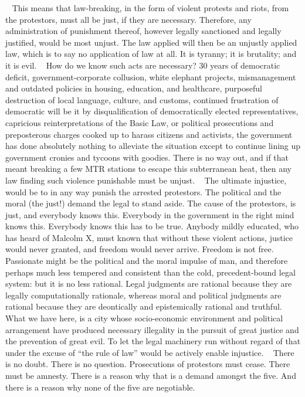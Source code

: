  
This means that law-breaking, in the form of violent protests and riots, from the protestors, must all be just, if they are necessary. Therefore, any administration of punishment thereof, however legally sanctioned and legally justified, would be most unjust. The law applied will then be an unjustly applied law, which is to say no application of law at all. It is tyranny; it is brutality; and it is evil.
 
How do we know such acts are necessary? 30 years of democratic deficit, government-corporate collusion, white elephant projects, mismanagement and outdated policies in housing, education, and healthcare, purposeful destruction of local language, culture, and customs, continued frustration of democratic will be it by disqualification of democratically elected representatives, capricious reinterpretations of the Basic Law, or political prosecutions and preposterous charges cooked up to harass citizens and activists, the government has done absolutely nothing to alleviate the situation except to continue lining up government cronies and tycoons with goodies. There is no way out, and if that meant breaking a few MTR stations to escape this subterranean heat, then any law finding such violence punishable must be unjust.
 
The ultimate injustice, would be to in any way punish the arrested protestors. The political and the moral (the just!) demand the legal to stand aside. The cause of the protestors, is just, and everybody knows this. Everybody in the government in the right mind knows this. Everybody knows this has to be true. Anybody mildly educated, who has heard of Malcolm X, must known that without these violent actions, justice would never granted, and freedom would never arrive. Freedom is not free.
 
Passionate might be the political and the moral impulse of man, and therefore perhaps much less tempered and consistent than the cold, precedent-bound legal system: but it is no less rational. Legal judgments are rational because they are legally computationally rationale, whereas moral and political judgments are rational because they are deontically and epistemically rational and truthful. What we have here, is a city whose socio-economic environment and political arrangement have produced necessary illegality in the pursuit of great justice and the prevention of great evil. To let the legal machinery run without regard of that under the excuse of “the rule of law” would be actively enable injustice.
 
There is no doubt. There is no question. Prosecutions of protestors must cease. There must be amnesty. There is a reason why that is a demand amongst the five. And there is a reason why none of the five are negotiable.
